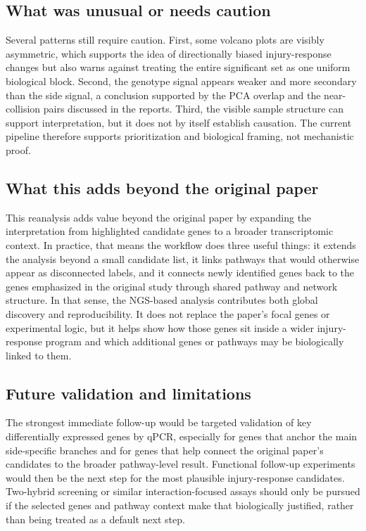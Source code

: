 \documentclass[12pt]{article}
\begin{document}
\subsection{What was unusual or needs caution}

Several patterns still require caution. First, some volcano plots are visibly asymmetric, which supports the idea of directionally biased injury-response changes but also warns against treating the entire significant set as one uniform biological block. Second, the genotype signal appears weaker and more secondary than the side signal, a conclusion supported by the PCA overlap and the near-collision pairs discussed in the reports. Third, the visible sample structure can support interpretation, but it does not by itself establish causation. The current pipeline therefore supports prioritization and biological framing, not mechanistic proof.

\subsection{What this adds beyond the original paper}

This reanalysis adds value beyond the original paper by expanding the interpretation from highlighted candidate genes to a broader transcriptomic context. In practice, that means the workflow does three useful things: it extends the analysis beyond a small candidate list, it links pathways that would otherwise appear as disconnected labels, and it connects newly identified genes back to the genes emphasized in the original study through shared pathway and network structure. In that sense, the NGS-based analysis contributes both global discovery and reproducibility. It does not replace the paper’s focal genes or experimental logic, but it helps show how those genes sit inside a wider injury-response program and which additional genes or pathways may be biologically linked to them.

\subsection{Future validation and limitations}

The strongest immediate follow-up would be targeted validation of key differentially expressed genes by qPCR, especially for genes that anchor the main side-specific branches and for genes that help connect the original paper’s candidates to the broader pathway-level result. Functional follow-up experiments would then be the next step for the most plausible injury-response candidates. Two-hybrid screening or similar interaction-focused assays should only be pursued if the selected genes and pathway context make that biologically justified, rather than being treated as a default next step.
\end{document}

